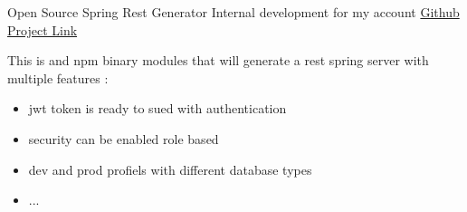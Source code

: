 


\begin{cventries}


\cventry
{Open Source Spring Rest Generator } %
{Internal development for my account } %
{ \href{https://github.com/medazzo/sbr-generator}{Github Project Link} }%
{} %
{ %
\begin{cvitems}
\item {This is and npm binary modules that will generate a rest spring server with multiple features :}
\begin{itemize}
\item {jwt token is ready to sued with authentication}
\item {security can be enabled  role based }
\item {dev and prod profiels with different  database types}
\item {...}
\end{itemize}
\end{cvitems}
}



\end{cventries}
